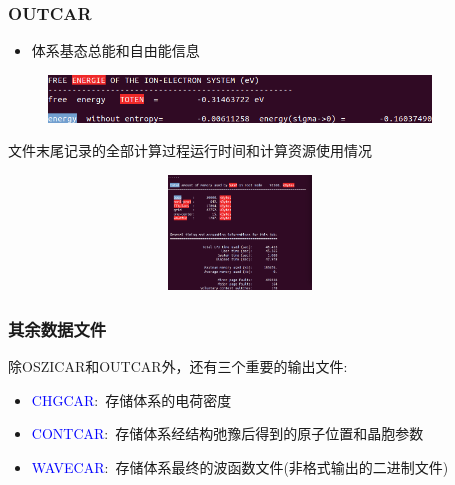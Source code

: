 \frame
{
	\frametitle{\textrm{OUTCAR}}
	\begin{itemize}
	\item 体系基态总能和自由能信息
	\end{itemize}
\begin{figure}[h!]
\centering
\includegraphics[height=0.5in,viewport=0 0 720 95,clip]{Figures/VASP_train-OUTCAR-free_energy.png}
\caption{\fontsize{6.2pt}{5.2pt}}%
\label{VASP_train-OUTCAR-free_energy}
\end{figure}
%
文件末尾记录的全部计算过程运行时间和计算资源使用情况%
\begin{figure}[h!]
\centering
\vskip -2pt
\includegraphics[height=1.2in,width=4.0in,viewport=0 0 680 215,clip]{Figures/Pt_atom-runtime.png}
\caption{\fontsize{6.2pt}{5.2pt}}%
\label{Pt_atom:runtime}
\end{figure}
}

\frame
{
	\frametitle{其余数据文件}
	除\textrm{OSZICAR}和\textrm{OUTCAR}外，还有三个重要的输出文件:~
	\begin{itemize}
		\item \textcolor{blue}{\textrm{CHGCAR}}:~存储体系的电荷密度
		\item \textcolor{blue}{\textrm{CONTCAR}}:~存储体系经结构弛豫后得到的原子位置和晶胞参数
		\item \textcolor{blue}{\textrm{WAVECAR}}:~存储体系最终的波函数文件(非格式输出的二进制文件)
	\end{itemize}
}


